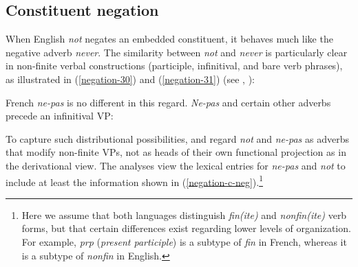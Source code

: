 \documentclass[output=paper
	        ,collection
	        ,collectionchapter
 	        ,biblatex
                ,babelshorthands
                ,newtxmath
                ,draftmode
                ,colorlinks, citecolor=brown
]{langscibook}
\begin{document}
{\begin{exe}
\begin{xlist}
\begin{exe}
\begin{xlist}
\subsection{Constituent negation}

When English \textit{not} negates an embedded constituent, it behaves
much like the negative adverb \textit{never}. The similarity between {\it
not} and \textit{never} is particularly clear in non-finite verbal
constructions (participle, infinitival, and bare verb phrases), as
illustrated in (\ref{negation-30}) and (\ref{negation-31}) (see \citealt{Klima:64,Kim:00},
\citealt[]{kimmichaelis:2020}):

\eal\label{negation-30}
\zl

\eal\label{negation-31}
\zl

\noindent
French \textit{ne-pas} is no different in this regard.  \textit{Ne-pas} and
certain other adverbs precede an infinitival VP:

\eal
{}
\zl

To capture such distributional possibilities, \citet{Kim:00} and \citet{KS:02} regard \textit{not} and \textit{ne-pas} as adverbs that modify
non-finite VPs, not as  heads of their own functional projection as in the derivational view. The
analyses view the lexical entries for \textit{ne-pas} and \textit{not} to include at
least the
information shown in (\ref{negation-c-neg}).\footnote{Here we assume that both languages
distinguish \textit{fin(ite)} and \textit{nonfin(ite)} verb forms, but that
certain differences exist regarding lower levels of organization. For example,
\textit{prp} (\textit{present participle}) is a subtype of \textit{fin} in French,
whereas it is a subtype of \textit{nonfin} in English.}


\end{xlist}
\end{exe}
\end{xlist}
\end{exe}}
\end{document}
